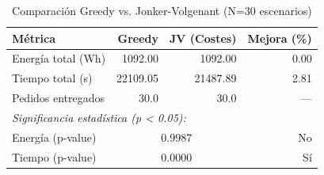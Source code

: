 \begin{table}[htbp]
\centering
\caption{Comparación Greedy vs. Jonker-Volgenant (N=30 escenarios)}
\label{tab:comparison}
\begin{tabular}{lrrr}
\hline
\textbf{Métrica} & \textbf{Greedy} & \textbf{JV (Costes)} & \textbf{Mejora (\%)} \\
\hline
Energía total (Wh) & 1092.00 & 1092.00 & 0.00 \\
Tiempo total (s) & 22109.05 & 21487.89 & 2.81 \\
Pedidos entregados & 30.0 & 30.0 & — \\
\hline
\multicolumn{4}{l}{\textit{Significancia estadística (p < 0.05):}} \\
Energía (p-value) & \multicolumn{2}{c}{0.9987} & No \\
Tiempo (p-value) & \multicolumn{2}{c}{0.0000} & Sí \\
\hline
\end{tabular}
\end{table}